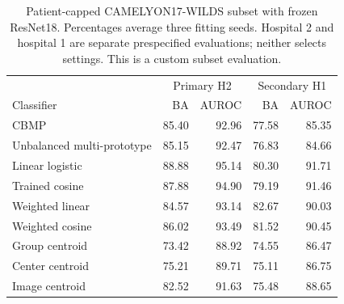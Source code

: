 \begin{table}[t]\centering\footnotesize\setlength{\tabcolsep}{3pt}
\begin{tabular}{lrrrr}\toprule
 & \multicolumn{2}{c}{Primary H2} & \multicolumn{2}{c}{Secondary H1}\\
Classifier & BA & AUROC & BA & AUROC\\\midrule
CBMP & 85.40 & 92.96 & 77.58 & 85.35\\
Unbalanced multi-prototype & 85.15 & 92.47 & 76.83 & 84.66\\
Linear logistic & 88.88 & 95.14 & 80.30 & 91.71\\
Trained cosine & 87.88 & 94.90 & 79.19 & 91.46\\
Weighted linear & 84.57 & 93.14 & 82.67 & 90.03\\
Weighted cosine & 86.02 & 93.49 & 81.52 & 90.45\\
Group centroid & 73.42 & 88.92 & 74.55 & 86.47\\
Center centroid & 75.21 & 89.71 & 75.11 & 86.75\\
Image centroid & 82.52 & 91.63 & 75.48 & 88.65\\
\bottomrule\end{tabular}
\caption{Patient-capped CAMELYON17-WILDS subset with frozen ResNet18. Percentages average three fitting seeds. Hospital 2 and hospital 1 are separate prespecified evaluations; neither selects settings. This is a custom subset evaluation.}
\label{tab:camelyon_main}\end{table}
